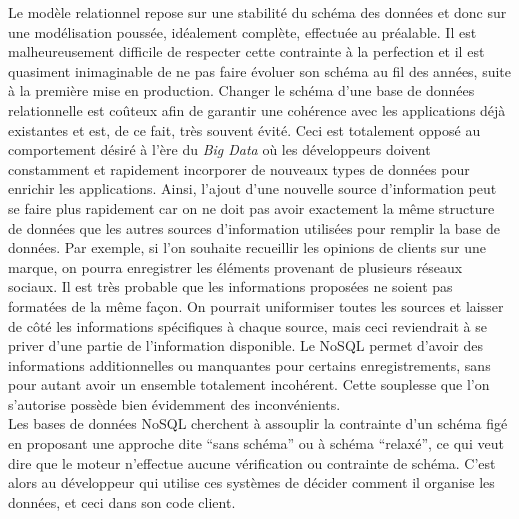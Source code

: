 
Le modèle relationnel repose sur une stabilité du schéma des données et donc sur une modélisation poussée, idéalement complète, effectuée au préalable. Il est malheureusement difficile de respecter cette contrainte à la perfection et il est quasiment inimaginable de ne pas faire évoluer son schéma au fil des années, suite à la première mise en production. Changer le schéma d'une base de données relationnelle est coûteux afin de garantir une cohérence avec les applications déjà existantes et est, de ce fait, très souvent évité. Ceci est totalement opposé au comportement désiré à l'ère du \textit{Big Data} où les développeurs doivent constamment et rapidement incorporer de nouveaux types de données pour enrichir les applications. Ainsi, l'ajout d'une nouvelle source d'information peut se faire plus rapidement car on ne doit pas avoir exactement la même structure de données que les autres sources d'information utilisées pour remplir la base de données. Par exemple, si l'on souhaite recueillir les opinions de clients sur une marque, on pourra enregistrer les éléments provenant de plusieurs réseaux sociaux. Il est très probable que les informations proposées ne soient pas formatées de la même façon. On pourrait uniformiser toutes les sources et laisser de côté les informations spécifiques à chaque source, mais ceci reviendrait à se priver d'une partie de l'information disponible. Le NoSQL permet d'avoir des informations additionnelles ou manquantes pour certains enregistrements, sans pour autant avoir un ensemble totalement incohérent. Cette souplesse que l'on s'autorise possède bien évidemment des inconvénients.\\

Les bases de données NoSQL cherchent à assouplir la contrainte d'un schéma figé en proposant une approche dite \enquote{sans schéma} ou à schéma \enquote{relaxé}, ce qui veut dire que le moteur n'effectue aucune vérification ou contrainte de schéma. C'est alors au développeur qui utilise ces systèmes de décider comment il organise les données, et ceci dans son code client.\\

